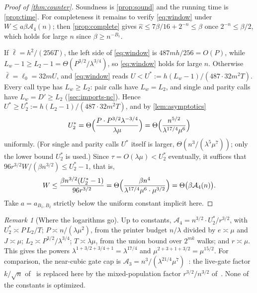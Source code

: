 \documentclass[11pt,letterpaper]{article}
\theoremstyle{definition}
\theoremstyle{remark}
\newtheorem{remark}[theorem]{Remark}
\newcommand{\khat}{\widehat\kappa}
\begin{document}
\begin{proof}[Proof of \cref{thm:counter}]
Soundness is \cref{prop:sound} and the running time is
\cref{prop:time}. For completeness it remains to verify
\eqref{eq:window} under \(W\le a\beta\mathcal A_4(n)\); then
\cref{prop:complete} gives \(\khat\le7\beta/16+2^{-n}\le\beta\) once
\(2^{-n}\le\beta/2\), which holds for large \(n\) since
\(\beta\ge n^{-B_1}\).

If \(\bar\ell=h^2/(256T)\), the left side of \eqref{eq:window} is
\(487mh/256=O(P)\), while
\(L_w-1\ge L_2-1=\Theta(P^{3/2}/\lambda^{3/4})\), so \eqref{eq:window}
holds for large \(n\). Otherwise \(\bar\ell=\ell_0=32mU\), and
\eqref{eq:window} reads \(U<U^*:=h(L_w-1)/(487\cdot32m^2T)\). Every call
type has \(L_w\ge L_2\): pair calls have \(L_w=L_2\), and single and
parity calls have \(L_w=D'\ge L_2\) (\cref{sec:imports-nc}). Hence
\(U^*\ge U^*_2:=h(L_2-1)/(487\cdot32m^2T)\), and by
\cref{lem:asymptotics}
\[
 U^*_2=\Theta\Bigl(\frac{P\cdot P^{3/2}\lambda^{-3/4}}{\lambda\mu}\Bigr)
 =\Theta\Bigl(\frac{n^{5/2}}{\lambda^{17/4}\mu^6}\Bigr)
\]
uniformly. (For single and parity calls \(U^*\) itself is larger,
\(\Theta(n^3/(\lambda^5\mu^7))\); only the lower bound \(U^*_2\) is
used.) Since \(\tau=O(\lambda\mu)<U^*_2\) eventually, it suffices that
\(96r^{3/2}W/(\beta n^{3/2})\le U^*_2-1\), that is,
\[
 W\le\frac{\beta n^{3/2}(U^*_2-1)}{96r^{3/2}}
 =\Theta\Bigl(\frac{\beta n^4}{\lambda^{17/4}\mu^{6}\cdot\mu^{3/2}}\Bigr)=\Theta\bigl(\beta\mathcal A_4(n)\bigr).
\]
Take \(a=a_{B_1,B_2}\) strictly below the uniform constant implicit
here.
\end{proof}

\begin{remark}[Where the logarithms go]\label{rem:logs}
Up to constants, \(\mathcal A_4=n^{3/2}\cdot U^*_2/r^{3/2}\), with
\(U^*_2\asymp P\,L_2/T\); \(P\asymp n/(\lambda\mu^2)\), from the printer
budget \(n/\lambda\) divided by \(e\asymp\mu\) and \(J\asymp\mu\);
\(L_2\asymp P^{3/2}/\lambda^{3/4}\); \(T\asymp\lambda\mu\), from the union
bound over \(2^{mk}\) walks; and \(r\asymp\mu\). This gives the powers
\(\lambda^{1+3/2+3/4+1}=\lambda^{17/4}\) and
\(\mu^{2+3+1+3/2}=\mu^{15/2}\). For comparison, the near-cubic gate cap
is \(\mathcal A_3=n^3/(\lambda^{21/4}\mu^7)\)~\cite[Theorem~3.1]{NagCG}:
the live-gate factor \(k/\sqrt n\) of~\cite[Lemma~3.3]{NagCG} is
replaced here by the mixed-population factor \(r^{3/2}/n^{3/2}\)
of~\cite[Theorem~A.4]{Nag72}. None of the constants is optimized.
\end{remark}
\end{document}
